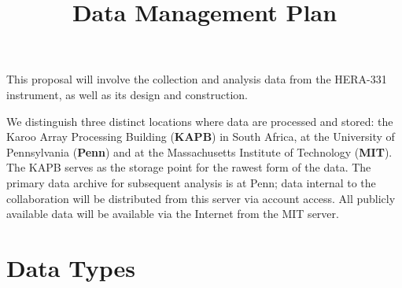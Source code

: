 \documentclass[preprint]{aastex}
\begin{document}
\title{Data Management Plan}

% 
% 

% 
% 
%




This proposal will involve the collection and analysis data from the HERA-331 instrument, as well as its design and construction.  

We distinguish three distinct locations where data are processed and stored: the Karoo Array Processing Building ({\bf KAPB}) in South Africa, at the University of Pennsylvania ({\bf Penn}) and at the Massachusetts Institute of Technology ({\bf MIT}).  The KAPB serves as the storage point for the rawest form of the data.  The primary data archive for subsequent analysis is at Penn;  data internal to the collaboration will be distributed from this server via account access.  All publicly available data will be available via the Internet from the MIT server. 

\section{Data Types}
\end{document}
